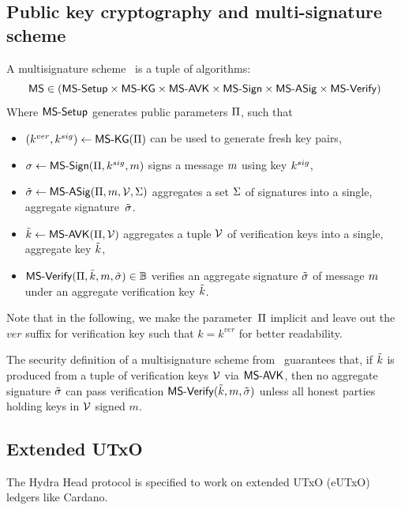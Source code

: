 \subsection{Public key cryptography and multi-signature scheme}\label{sec:multisig}

A multisignature scheme~\cite{itakura1983public,CCS:MicOhtRey01} is a
tuple of algorithms:
\[
\mathsf{MS} \in (\mathsf{MS\textsf{-}{}Setup} \times \allowbreak\mathsf{MS\textsf{-}{}KG} \times \allowbreak\mathsf{MS\textsf{-}{}AVK} \times \allowbreak
\mathsf{MS\textsf{-}{}Sign} \times \allowbreak\mathsf{MS\textsf{-}{}ASig} \times \allowbreak\mathsf{MS\textsf{-}{}Verify})
\]
Where $\mathsf{MS\textsf{-}{}Setup}$ generates public parameters $\Pi$, such that
\begin{itemize}
  \item $(k^{ver},k^{sig}) \gets \mathsf{MS\textsf{-}{}KG}(\Pi)$ can be used to generate fresh
        key pairs,
  \item $\sigma \gets \mathsf{MS\textsf{-}{}Sign}(\Pi,k^{sig},m)$ signs a message $m$
        using key $k^{sig}$,
  \item $\tilde\sigma \gets \mathsf{MS\textsf{-}{}ASig}(\Pi,m,\mathcal{V},\Sigma)$ aggregates
         a set $\Sigma$ of signatures into a single,
        aggregate signature~$\tilde\sigma$.
  \item $\tilde{k} \gets \mathsf{MS\textsf{-}{}AVK}(\Pi,\mathcal{V})$ aggregates a tuple
        $\mathcal{V}$ of verification keys into a single, aggregate key
        $\tilde{k}$,
  \item $\mathsf{MS\textsf{-}{}Verify}(\Pi,\tilde{k},m,\tilde\sigma) \in \mathbb{B}$ verifies an aggregate
        signature $\tilde\sigma$ of message $m$ under an aggregate verification
        key $\tilde{k}$.
\end{itemize}

Note that in the following, we make the parameter~$\Pi$ implicit and leave
out the $ver$ suffix for verification key such that $k = k^{ver}$ for better
readability.

The security definition of a multisignature scheme
from~\cite{itakura1983public,CCS:MicOhtRey01} guarantees that, if $\tilde{k}$ is
produced from a tuple of verification keys $\mathcal{V}$ via $\mathsf{MS\textsf{-}{}AVK}$,
then no aggregate signature $\tilde\sigma$ can pass verification
$\mathsf{MS\textsf{-}{}Verify}(\tilde{k},m,\tilde\sigma)$ unless all honest parties holding keys in
$\mathcal{V}$ signed $m$.

\subsection{Extended UTxO}
The Hydra Head protocol is specified to work on extended UTxO (eUTxO) ledgers
like Cardano.

